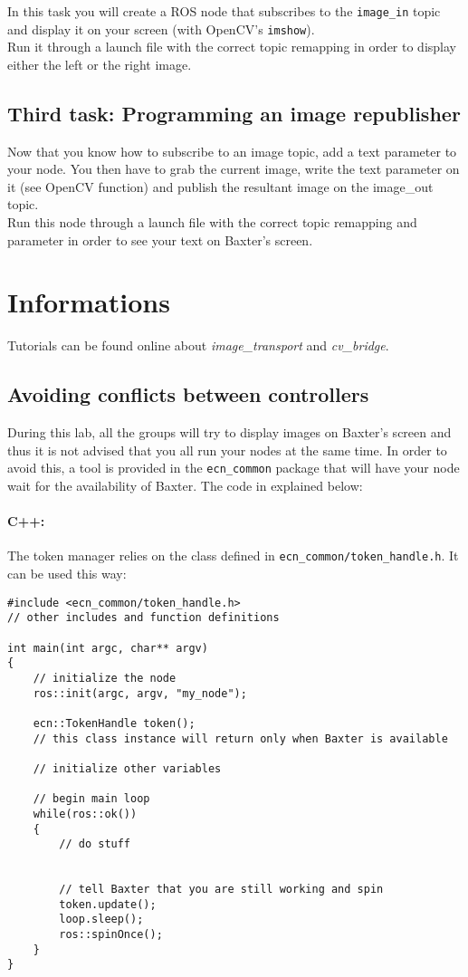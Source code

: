 \documentclass{ecnreport}
\begin{document}
In this task you will create a ROS node that subscribes to the \texttt{image\_in} topic and display it on your screen (with OpenCV's \texttt{imshow}).\\
Run it through a launch file with the correct topic remapping in order to display either the left or the right image.

\subsection{Third task: Programming an image republisher}

Now that you know how to subscribe to an image topic, add a text parameter to your node. You then have to grab the current image, write the text parameter on it (see OpenCV function)
and publish the resultant image on the {image\_out} topic.\\
Run this node through a launch file with the correct topic remapping and parameter in order to see your text on Baxter's screen.


\section{Informations}

Tutorials can be found online about \emph{image\_transport} and \emph{cv\_bridge}.
 
 \subsection{Avoiding conflicts between controllers}
 
 During this lab, all the groups will try to display images on Baxter's screen and thus it is not advised
 that you all run your nodes at the same time. In order to avoid this, a tool is provided in the  \texttt{ecn\_common}
 package that will have your node wait for the availability of Baxter. The code in explained below:
 
 \paragraph{C++: } The token manager relies on the class defined in \texttt{ecn\_common/token\_handle.h}. It can be used this way:
\cppstyle \begin{lstlisting}
#include <ecn_common/token_handle.h>
// other includes and function definitions

int main(int argc, char** argv)
{
    // initialize the node
    ros::init(argc, argv, "my_node");

    ecn::TokenHandle token();
    // this class instance will return only when Baxter is available
    
    // initialize other variables

    // begin main loop
    while(ros::ok())
    {
        // do stuff
        

        // tell Baxter that you are still working and spin
        token.update();
        loop.sleep();
        ros::spinOnce();
    }
}
\end{lstlisting}
\end{document}
